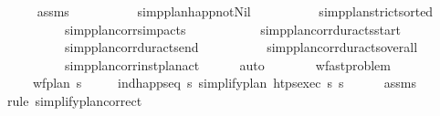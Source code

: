 \begin{isabellebody}
\ \ \ \ \isamarkupfalse%
\ assms\isanewline
\ \ \ \ \ \ \ \ \ \ simp{\isacharunderscore}{\kern0pt}plan{\isacharunderscore}{\kern0pt}happ{\isacharunderscore}{\kern0pt}not{\isacharunderscore}{\kern0pt}Nil\isanewline
\ \ \ \ \ \ \ \ \ \ simp{\isacharunderscore}{\kern0pt}plan{\isacharunderscore}{\kern0pt}strict{\isacharunderscore}{\kern0pt}sorted\ \isanewline
\ \ \ \ \ \ \ \ \ \ simp{\isacharunderscore}{\kern0pt}plan{\isacharunderscore}{\kern0pt}corr{\isacharunderscore}{\kern0pt}simp{\isacharunderscore}{\kern0pt}acts\ \isanewline
\ \ \ \ \ \ \ \ \ \ simp{\isacharunderscore}{\kern0pt}plan{\isacharunderscore}{\kern0pt}corr{\isacharunderscore}{\kern0pt}dur{\isacharunderscore}{\kern0pt}acts{\isacharunderscore}{\kern0pt}start\isanewline
\ \ \ \ \ \ \ \ \ \ simp{\isacharunderscore}{\kern0pt}plan{\isacharunderscore}{\kern0pt}corr{\isacharunderscore}{\kern0pt}dur{\isacharunderscore}{\kern0pt}acts{\isacharunderscore}{\kern0pt}end\isanewline
\ \ \ \ \ \ \ \ \ \ simp{\isacharunderscore}{\kern0pt}plan{\isacharunderscore}{\kern0pt}corr{\isacharunderscore}{\kern0pt}dur{\isacharunderscore}{\kern0pt}acts{\isacharunderscore}{\kern0pt}overall\isanewline
\ \ \ \ \ \ \ \ \ \ simp{\isacharunderscore}{\kern0pt}plan{\isacharunderscore}{\kern0pt}corr{\isacharunderscore}{\kern0pt}inst{\isacharunderscore}{\kern0pt}plan{\isacharunderscore}{\kern0pt}act\isanewline
\ \ \ \ \isamarkupfalse%
\ auto%
\endisatagproof
{\isafoldproof}%
%
\isadelimproof
\isanewline
%
\endisadelimproof
\isanewline
\ \ \isanewline
\ \ \isamarkupfalse%
\ {\isacharparenleft}{\kern0pt}\ wf{\isacharunderscore}{\kern0pt}ast{\isacharunderscore}{\kern0pt}problem{\isacharparenright}{\kern0pt}\isanewline
\ \ \ \ \ {\isachardoublequoteopen}wf{\isacharunderscore}{\kern0pt}plan\ {\isasympi}s{\isachardoublequoteclose}\isanewline
\ \ \ \ \ {\isachardoublequoteopen}ind{\isacharunderscore}{\kern0pt}happ{\isacharunderscore}{\kern0pt}seq\ {\isasympi}s\ {\isacharparenleft}{\kern0pt}simplify{\isacharunderscore}{\kern0pt}plan\ {\isacharparenleft}{\kern0pt}htps{\isacharunderscore}{\kern0pt}exec\ {\isasympi}s{\isacharparenright}{\kern0pt}\ {\isasympi}s{\isacharparenright}{\kern0pt}{\isachardoublequoteclose}\isanewline
%
\isadelimproof
\ \ \ \ %
\endisadelimproof
%
\isatagproof
{}\isamarkupfalse%
\ assms\ \isamarkupfalse%
\ {\isacharparenleft}{\kern0pt}rule\ simplify{\isacharunderscore}{\kern0pt}plan{\isacharunderscore}{\kern0pt}correct{\isacharparenright}{\kern0pt}%
\endisatagproof

\end{isabellebody}
